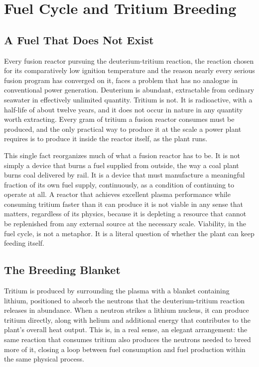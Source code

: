 \chapter{Fuel Cycle and Tritium Breeding}

\section{A Fuel That Does Not Exist}

Every fusion reactor pursuing the deuterium-tritium reaction, the reaction chosen for its comparatively low ignition temperature and the reason nearly every serious fusion program has converged on it, faces a problem that has no analogue in conventional power generation. Deuterium is abundant, extractable from ordinary seawater in effectively unlimited quantity. Tritium is not. It is radioactive, with a half-life of about twelve years, and it does not occur in nature in any quantity worth extracting. Every gram of tritium a fusion reactor consumes must be produced, and the only practical way to produce it at the scale a power plant requires is to produce it inside the reactor itself, as the plant runs.

This single fact reorganizes much of what a fusion reactor has to be. It is not simply a device that burns a fuel supplied from outside, the way a coal plant burns coal delivered by rail. It is a device that must manufacture a meaningful fraction of its own fuel supply, continuously, as a condition of continuing to operate at all. A reactor that achieves excellent plasma performance while consuming tritium faster than it can produce it is not viable in any sense that matters, regardless of its physics, because it is depleting a resource that cannot be replenished from any external source at the necessary scale. Viability, in the fuel cycle, is not a metaphor. It is a literal question of whether the plant can keep feeding itself.

\section{The Breeding Blanket}

Tritium is produced by surrounding the plasma with a blanket containing lithium, positioned to absorb the neutrons that the deuterium-tritium reaction releases in abundance. When a neutron strikes a lithium nucleus, it can produce tritium directly, along with helium and additional energy that contributes to the plant's overall heat output. This is, in a real sense, an elegant arrangement: the same reaction that consumes tritium also produces the neutrons needed to breed more of it, closing a loop between fuel consumption and fuel production within the same physical process.

